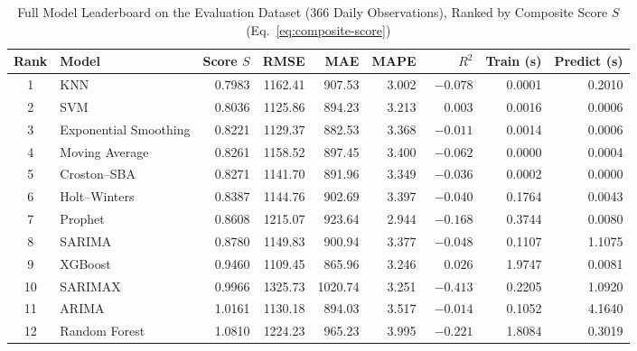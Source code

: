 \begin{table}[!t]
\caption{Full Model Leaderboard on the Evaluation Dataset (366 Daily Observations), Ranked by Composite Score $S$ (Eq.~\eqref{eq:composite-score})}
\label{tab:model-comparison}
\centering
\begin{tabular}{@{}clrrrrrrr@{}}
\toprule
\textbf{Rank} & \textbf{Model} & \textbf{Score $S$} & \textbf{RMSE} & \textbf{MAE} & \textbf{MAPE} & \textbf{$R^2$} & \textbf{Train (s)} & \textbf{Predict (s)} \\
\midrule
1  & KNN                  & 0.7983 & 1162.41 & 907.53 & 3.002 & $-0.078$ & 0.0001 & 0.2010 \\
2  & SVM                  & 0.8036 & 1125.86 & 894.23 & 3.213 & $\phantom{-}0.003$ & 0.0016 & 0.0006 \\
3  & Exponential Smoothing & 0.8221 & 1129.37 & 882.53 & 3.368 & $-0.011$ & 0.0014 & 0.0006 \\
4  & Moving Average       & 0.8261 & 1158.52 & 897.45 & 3.400 & $-0.062$ & 0.0000 & 0.0004 \\
5  & Croston--SBA         & 0.8271 & 1141.70 & 891.96 & 3.349 & $-0.036$ & 0.0002 & 0.0000 \\
6  & Holt--Winters        & 0.8387 & 1144.76 & 902.69 & 3.397 & $-0.040$ & 0.1764 & 0.0043 \\
7  & Prophet              & 0.8608 & 1215.07 & 923.64 & 2.944 & $-0.168$ & 0.3744 & 0.0080 \\
8  & SARIMA               & 0.8780 & 1149.83 & 900.94 & 3.377 & $-0.048$ & 0.1107 & 1.1075 \\
9  & XGBoost              & 0.9460 & 1109.45 & 865.96 & 3.246 & $\phantom{-}0.026$ & 1.9747 & 0.0081 \\
10 & SARIMAX              & 0.9966 & 1325.73 & 1020.74 & 3.251 & $-0.413$ & 0.2205 & 1.0920 \\
11 & ARIMA                & 1.0161 & 1130.18 & 894.03 & 3.517 & $-0.014$ & 0.1052 & 4.1640 \\
12 & Random Forest        & 1.0810 & 1224.23 & 965.23 & 3.995 & $-0.221$ & 1.8084 & 0.3019 \\
\bottomrule
\end{tabular}
\end{table}
